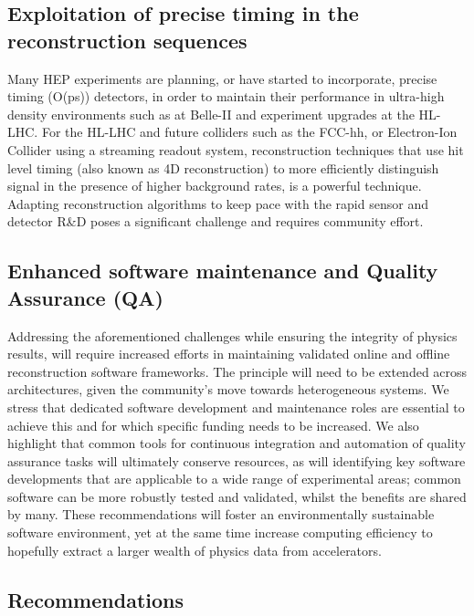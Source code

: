 \documentclass[10pt,a4paper]{article}
\begin{document}
\subsection{Exploitation of precise timing in the reconstruction
sequences}\label{exploitation-of-precise-timing-in-the-reconstruction-sequences}

Many HEP experiments are planning, or have started to incorporate,
precise timing (O(ps)) detectors, in order to maintain their performance
in ultra-high density environments such as at Belle-II and experiment
upgrades at the HL-LHC. For the HL-LHC and future colliders such as the
FCC-hh, or Electron-Ion Collider using a streaming readout system,
reconstruction techniques that use hit level timing (also known as 4D
reconstruction) to more efficiently distinguish signal in the presence
of higher background rates, is a powerful technique. Adapting
reconstruction algorithms to keep pace with the rapid sensor and
detector R\&D poses a significant challenge and requires community
effort.

\subsection{Enhanced software maintenance and Quality Assurance
(QA)}\label{enhanced-software-maintenance-and-quality-assurance-qa}

Addressing the aforementioned challenges while ensuring the integrity of
physics results, will require increased efforts in maintaining validated
online and offline reconstruction software frameworks. The principle
will need to be extended across architectures, given the community's
move towards heterogeneous systems. We stress that dedicated software
development and maintenance roles are essential to achieve this and for
which specific funding needs to be increased. We also highlight that
common tools for continuous integration and automation of quality
assurance tasks will ultimately conserve resources, as will identifying
key software developments that are applicable to a wide range of
experimental areas; common software can be more robustly tested and
validated, whilst the benefits are shared by many. These recommendations
will foster an environmentally sustainable software environment, yet at
the same time increase computing efficiency to hopefully extract a
larger wealth of physics data from accelerators.

\subsection{Recommendations}\label{recommendations-2}
\end{document}
